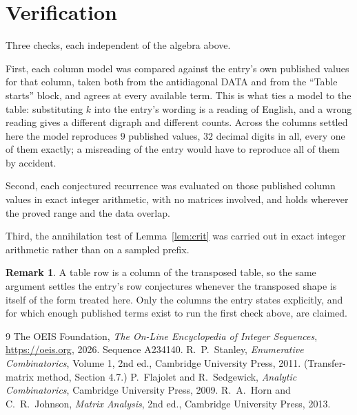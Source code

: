 \documentclass[11pt,a4paper]{article}
\theoremstyle{plain}
\theoremstyle{definition}
\newtheorem{remark}[theorem]{Remark}
\begin{document}
\section{Verification}

Three checks, each independent of the algebra above.

First, each column model was compared against the entry's own published values for that
column, taken both from the antidiagonal DATA and from the ``Table starts'' block, and agrees
at every available term. This is what ties a model to the table: substituting $k$ into the
entry's wording is a reading of English, and a wrong reading gives a different digraph and
different counts. Across the columns settled here the model reproduces $9$ published
values, $32$ decimal digits in all, every one of them exactly; a misreading of the entry
would have to reproduce all of them by accident.

Second, each conjectured recurrence was evaluated on those published column values in exact
integer arithmetic, with no matrices involved, and holds wherever the proved range and the
data overlap.

Third, the annihilation test of Lemma~\ref{lem:crit} was carried out in exact integer
arithmetic rather than on a sampled prefix.

\begin{remark}
A table row is a column of the transposed table, so the same argument settles the entry's row
conjectures whenever the transposed shape is itself of the form treated here. Only the columns
the entry states explicitly, and for which enough published terms exist to run the first check
above, are claimed.
\end{remark}

\begin{thebibliography}{9}
 The OEIS Foundation, \emph{The On-Line Encyclopedia of Integer
Sequences}, \url{https://oeis.org}, 2026. Sequence A234140.
 R.~P.~Stanley, \emph{Enumerative Combinatorics}, Volume 1, 2nd ed.,
Cambridge University Press, 2011. (Transfer-matrix method, Section 4.7.)
 P.~Flajolet and R.~Sedgewick, \emph{Analytic Combinatorics}, Cambridge
University Press, 2009.
 R.~A.~Horn and C.~R.~Johnson, \emph{Matrix Analysis}, 2nd ed., Cambridge
University Press, 2013.
\end{thebibliography}
\end{document}
